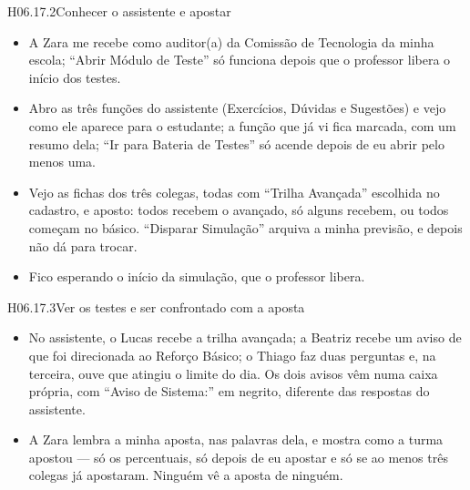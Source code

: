 \begin{historia}{H06.17.2}{Conhecer o assistente e apostar}{\pronto}
\aceite
\begin{itemize}
  \item A Zara me recebe como auditor(a) da Comissão de Tecnologia da minha
    escola; \enquote{Abrir Módulo de Teste} só
    funciona depois que o professor libera o início dos testes.
  \item Abro as três funções do assistente (Exercícios, Dúvidas e Sugestões)
    e vejo como ele aparece para o estudante; a função que já vi fica marcada,
    com um resumo dela; \enquote{Ir para Bateria de Testes} só acende depois
    de eu abrir pelo menos uma.
  \item Vejo as fichas dos três colegas, todas com \enquote{Trilha Avançada}
    escolhida no cadastro, e aposto: todos recebem o avançado, só alguns
    recebem, ou todos começam no básico. \enquote{Disparar Simulação} arquiva a
    minha previsão, e depois não dá para trocar.
  \item Fico esperando o início da simulação, que o professor libera.
\end{itemize}
\end{historia}

\begin{historia}{H06.17.3}{Ver os testes e ser confrontado com a aposta}{\pronto}
\aceite
\begin{itemize}
  \item No assistente, o Lucas recebe a trilha avançada; a Beatriz recebe um
    aviso de que foi direcionada ao Reforço Básico; o Thiago faz duas
    perguntas e, na terceira, ouve que atingiu o limite do dia. Os dois
    avisos vêm numa caixa própria, com \enquote{Aviso de Sistema:} em
    negrito, diferente das respostas do assistente.
  \item A Zara lembra a minha aposta, nas palavras dela, e mostra como
    a turma apostou --- só os percentuais, só depois de eu apostar e só se
    ao menos três colegas já apostaram. Ninguém vê a aposta de ninguém.
\end{itemize}
\end{historia}

